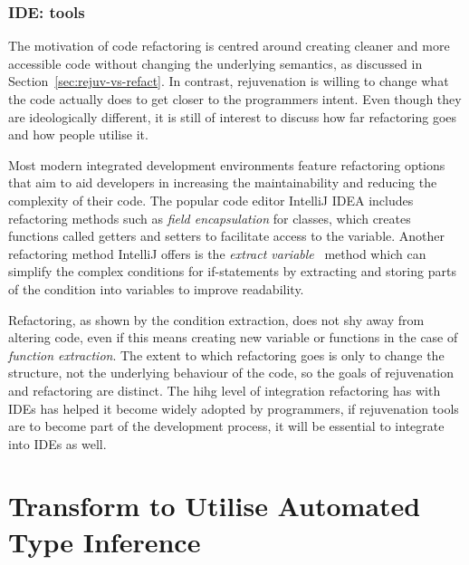 \documentclass[bsc,frontabs,singlespacing,twoside,parskip,deptreport]{infthesis}
\begin{document}
\subsection{IDE: tools}

The motivation of code refactoring is centred around creating cleaner and more accessible code without changing the underlying semantics, as discussed in Section~\ref{sec:rejuv-vs-refact}. In contrast, rejuvenation is willing to change what the code actually does to get closer to the programmers intent. Even though they are ideologically different, it is still of interest to discuss how far refactoring goes and how people utilise it.

Most modern integrated development environments feature refactoring options that aim to aid developers in increasing the maintainability and reducing the complexity of their code. The popular code editor IntelliJ IDEA \cite{IDEA} includes refactoring methods such as \textit{field encapsulation} \cite{IDEA_ENCAP} for classes, which creates functions called getters and setters to facilitate access to the variable. Another refactoring method IntelliJ offers is the \textit{extract variable}~\cite{IDEA_EXTRACT} method which can simplify the complex conditions for if-statements by extracting and storing parts of the condition into variables to improve readability.

Refactoring, as shown by the condition extraction, does not shy away from altering code, even if this means creating new variable or functions in the case of \textit{function extraction}. The extent to which refactoring goes is only to change the structure, not the underlying behaviour of the code, so the goals of rejuvenation and refactoring are distinct. The hihg level of integration refactoring has with IDEs has helped it become widely adopted by programmers, if rejuvenation tools are to become part of the development process, it will be essential to integrate into IDEs as well.




\chapter{Transform to Utilise Automated Type Inference}\label{chp:auto-tranform}
\end{document}
